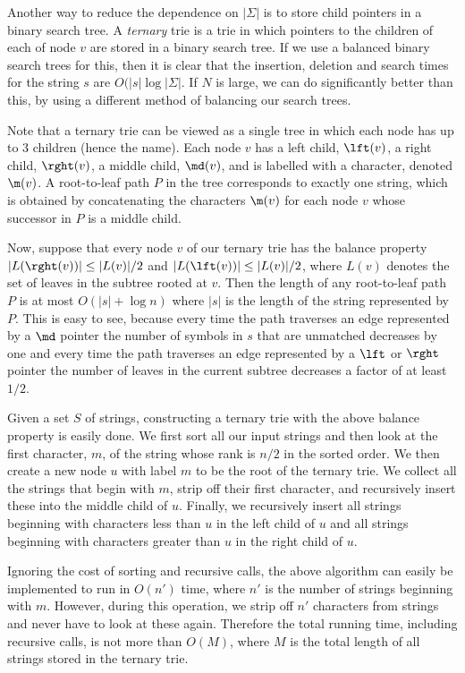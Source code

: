 Another way to reduce the dependence on $|\Sigma|$ is to store child
pointers in a binary search tree.  A \emph{ternary} trie is a trie in
which pointers to the children of each of node $v$ are stored in a binary
search tree.  If we use a balanced binary search trees for this, then
it is clear that the insertion, deletion and search times for the string
$s$ are $O(|s|\log|\Sigma|$.  If $N$ is large, we can do significantly better
than this, by using a different method of balancing our search trees.

Note that a ternary trie can be viewed as a single tree in which each
node has up to 3 children (hence the name).  Each node $v$ has a left
child, $\lft(v)$, a right child, $\rght(v)$, a middle child, $\md(v)$,
and is labelled with a character, denoted $\m(v)$.  A root-to-leaf path
$P$ in the tree corresponds to exactly one string, which is obtained by
concatenating the characters $\m(v)$ for each node $v$ whose successor
in $P$ is a middle child.

Now, suppose that every node $v$ of our ternary trie has the balance
property $|L(\rght(v))|\le |L(v)|/2$ and $|L(\lft(v))|\le |L(v)|/2$,
where $L(v)$ denotes the set of leaves in the subtree rooted at $v$.
Then the length of any root-to-leaf path $P$ is at most $O(|s|+\log
n)$ where $|s|$ is the length of the string represented by $P$.  This
is easy to see, because every time the path traverses an edge
represented by a $\md$ pointer the number of symbols in $s$ that are
unmatched decreases by one and every time the path traverses an edge
represented by a $\lft$ or $\rght$ pointer the number of leaves in the
current subtree decreases a factor of at least $1/2$.

Given a set $S$ of strings, constructing a ternary trie with the above
balance property is easily done.  We first sort all our input strings
and then look at the first character, $m$, of the string whose rank is
$n/2$ in the sorted order.  We then create a new node $u$ with label
$m$ to be the root of the ternary trie.  We collect all the strings
that begin with $m$, strip off their first character, and recursively
insert these into the middle child of $u$.  Finally, we recursively
insert all strings beginning with characters less than $u$ in the left
child of $u$ and all strings beginning with characters greater than
$u$ in the right child of $u$.

Ignoring the cost of sorting and recursive calls, the above algorithm
can easily be implemented to run in $O(n')$ time, where $n'$ is the
number of strings beginning with $m$.  However, during this operation,
we strip off $n'$ characters from strings and never have to look at
these again.  Therefore the total running time, including recursive
calls, is not more than $O(M)$, where $M$ is the total length of all strings stored in the ternary trie.

